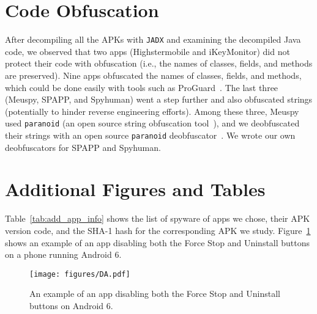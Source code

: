 \section{Code Obfuscation}
\label{sec:apk_obfuscation}

After decompiling all the APKs with \texttt{JADX} and examining the
decompiled Java code, we observed that two apps (Highstermobile and
iKeyMonitor) did not protect their code with obfuscation
(i.e., the names of classes, fields, and methods are preserved). Nine
apps obfuscated the names of classes, fields, and methods, which could
be done easily with tools such as ProGuard~\cite{LeaderIn1:online}.
The last three (Meuspy, SPAPP, and Spyhuman)
went a step further and also obfuscated strings (potentially to hinder
reverse engineering efforts). Among these three, Meuspy used
\texttt{paranoid} (an open source string obfuscation
tool~\cite{MichaelR90:online}), and we deobfuscated their strings with
an open source \texttt{paranoid}
deobfuscator~\cite{giacomof39:online}. We wrote our own deobfuscators
for SPAPP and Spyhuman.


\section{Additional Figures and Tables}
\label{sec:additional_figures}

Table~\ref{tab:add_app_info} shows the list of spyware of apps we chose, their APK version code, and the SHA-1 hash for the corresponding APK we study.
Figure~\ref{fig:da} shows an example of an app disabling both the Force Stop and Uninstall buttons on a phone running Android 6.

\vspace*{2in}
\hspace*{1in}

\begin{figure}[t]
\centering
\texttt{[image: figures/DA.pdf]}
\caption{An example of an app disabling both the
Force Stop and Uninstall buttons on Android 6.}
\label{fig:da}
\end{figure}
